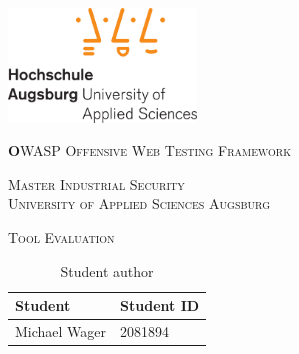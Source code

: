 \documentclass[
11pt,
liststotoc,
bibtotocnumbered,
headheight=34pt     %
]{scrartcl}             %
\begin{document}
	\begin{titlepage}
		\centering
		\includegraphics[width=5cm]{figures/hsa_logo-eps-converted-to.pdf}
		
		\vspace{1cm}
		{\scshape\LARGE\textbf OWASP Offensive Web Testing Framework\par}
		\vspace{0.3cm}
		{\scshape\Large
			Master Industrial Security \\
			University of Applied Sciences Augsburg
			
			\par}
		\vspace{1cm}
		
		{\scshape\huge Tool Evaluation	\par}
		
		\vspace{8cm}
		
		\begin{table}[!htbp]
			\centering
			\caption{Student author}
			\begin{tabular}{ll}
				\textbf{Student}			&	\textbf{Student ID}		\\
				\hline
				\hline
				Michael Wager	&	2081894			\\
			\end{tabular}
		\end{table}
		
		\date{\today}
	\end{titlepage}
	
	
	
	
	
\end{document}
